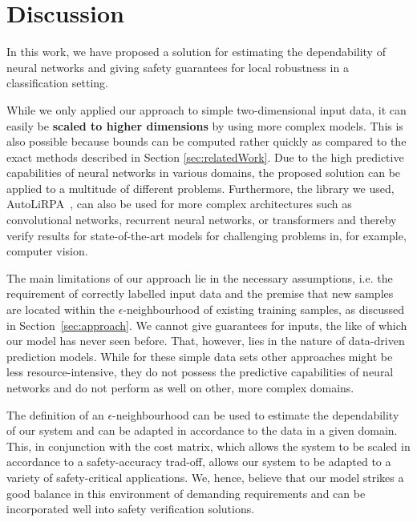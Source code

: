 \documentclass[acmsmall,nonacm]{acmart}
\begin{document}
\section{Discussion}
In this work, we have proposed a solution for estimating the dependability of neural networks and giving safety guarantees for local robustness in a classification setting.

While we only applied our approach to simple two-dimensional input data, it can easily be \textbf{scaled to higher dimensions} by using more complex models. This is also possible because bounds can be computed rather quickly as compared to the exact methods described in Section \ref{sec:relatedWork}. Due to the high predictive capabilities of neural networks in various domains, the proposed solution can be applied to a multitude of different problems. Furthermore, the library we used, AutoLiRPA~\cite{xu2020autoLiRPA}, can also be used for more complex architectures such as convolutional networks, recurrent neural networks, or transformers and thereby verify results for state-of-the-art models for challenging problems in, for example, computer vision.

The main limitations of our approach lie in the necessary assumptions, i.e. the requirement of correctly labelled input data and the premise that new samples are located within the $\epsilon$-neighbourhood of existing training samples, as discussed in Section~\ref{sec:approach}. We cannot give guarantees for inputs, the like of which our model has never seen before. That, however, lies in the nature of data-driven prediction models. While for these simple data sets other approaches might be less resource-intensive, they do not possess the predictive capabilities of neural networks and do not perform as well on other, more complex domains.

The definition of an $\epsilon$-neighbourhood can be used to estimate the dependability of our system and can be adapted in accordance to the data in a given domain. This, in conjunction with the cost matrix, which allows the system to be scaled in accordance to a safety-accuracy trad-off, allows our system to be adapted to a variety of safety-critical applications. 
We, hence, believe that our model strikes a good balance in this environment of demanding requirements and can be incorporated well into safety verification solutions. %


\pagebreak  




\end{document}

